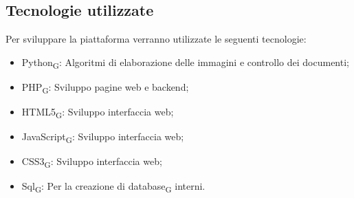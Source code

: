 \subsection{Tecnologie utilizzate}
Per sviluppare la piattaforma verranno utilizzate le seguenti tecnologie:
\begin{itemize}
    \item Python\textsubscript{G}: Algoritmi di elaborazione delle immagini e controllo dei documenti;
    \item PHP\textsubscript{G}: Sviluppo pagine web e backend;
    \item HTML5\textsubscript{G}: Sviluppo interfaccia web;
    \item JavaScript\textsubscript{G}: Sviluppo interfaccia web;
    \item CSS3\textsubscript{G}: Sviluppo interfaccia web;
    \item Sql\textsubscript{G}: Per la creazione di database\textsubscript{G} interni.
\end{itemize}


